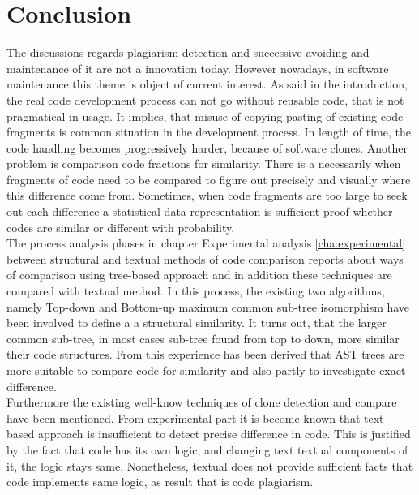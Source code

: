 \documentclass{report}
\begin{document}


\chapter{Conclusion}
\label{cha:Conclusion}

The discussions regards plagiarism detection and successive avoiding and maintenance of it are not a innovation today. However nowadays, in software maintenance this theme is object of current interest. As said in the introduction, the real code development process can not go without reusable code, that is not pragmatical in usage. It implies, that misuse of copying-pasting of existing code fragments is common situation in the development process. In length of time, the code handling becomes progressively harder, because of software clones. Another problem is comparison code fractions for similarity. There is a necessarily when fragments of code need to be compared to figure out precisely and visually where this difference come from. 
Sometimes, when code fragments are too large to seek out each difference a statistical data representation is sufficient proof whether codes are similar or different with probability.
\\
The process analysis phases in chapter Experimental analysis \ref{cha:experimental} between structural and textual methods of code comparison reports about ways of comparison using tree-based approach and in addition these techniques are compared with textual method. In this process, the existing two algorithms, namely Top-down and Bottom-up maximum common sub-tree isomorphism have been involved to define a a structural similarity. It turns out, that the larger common sub-tree, in most cases sub-tree found from top to down, more similar their code structures. From this experience has been derived that AST trees are more suitable to compare code for similarity and also partly to investigate exact difference.
\\
Furthermore the existing well-know techniques of clone detection and compare have been mentioned. From experimental part it is become known that text-based approach is insufficient to detect precise difference in code. This is justified by the fact that code has its own logic, and changing text textual components of it, the logic stays same. Nonetheless, textual does not provide sufficient facts that code implements same logic, as result that is code plagiarism. 
\end{document}
